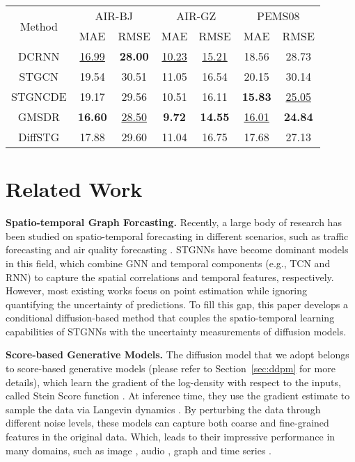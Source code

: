 {\begin{table}[htbp]
\begin{tabular}{c|cc|cc|cc}
\hline %
\multirow{2}{*}{Method}
& \multicolumn{2}{|c|}{ AIR-BJ}& \multicolumn{2}{|c|}{ AIR-GZ }& \multicolumn{2}{|c}{ PEMS08 }\\
\cline{2-7}
 & MAE & RMSE & MAE & RMSE & MAE & RMSE\\
\hline \hline
DCRNN & \underline{16.99} & \textbf{28.00} & \underline{10.23} & \underline{15.21} & 18.56 & 28.73 \\ \hline
STGCN & 19.54 & 30.51 & 11.05 & 16.54 & 20.15 & 30.14 \\ \hline
STGNCDE & 19.17 & 29.56 & 10.51 & 16.11 & \textbf{15.83} & \underline{25.05} \\ \hline
GMSDR & \textbf{16.60} & \underline{28.50} & \textbf{9.72} & \textbf{14.55} & \underline{16.01} & \textbf{24.84} \\ \hline
DiffSTG & 17.88 & 29.60 & 11.04 & 16.75 & 17.68 & 27.13 \\ \hline
\end{tabular}
\label{tab:results_determinstic}
\end{table}

\section{Related Work}\label{sec:related}

\par  \textbf{Spatio-temporal Graph Forcasting.} Recently, a large body of research has been studied on spatio-temporal forecasting in different scenarios, such as traffic forecasting \cite{STGCN-2018, GraphWaveNet-2019,  guo2021learning, peng2020spatial, ji2022stden} and air quality forecasting \cite{liang2022airformer}. STGNNs have become dominant models in this field, which combine GNN and temporal components (e.g., TCN and RNN) to capture the spatial correlations and temporal features, respectively. However, most existing works focus on point estimation while ignoring quantifying the uncertainty of predictions. To fill this gap, this paper develops a conditional diffusion-based method that couples the spatio-temporal learning capabilities of STGNNs with the uncertainty measurements of diffusion models.

\par \textbf{Score-based Generative Models.} The diffusion model that we adopt belongs to score-based generative models (please refer to Section~\ref{sec:ddpm} for more details), which learn the gradient of the log-density with respect to the inputs, called Stein Score function \cite{hyvarinen2005estimation, vincent2011connection}. At inference time, they use the gradient estimate to sample the data via Langevin dynamics \cite{song2019generative}. By perturbing the data through different noise levels, these models can capture both coarse and fine-grained features in the original data. Which, leads to their impressive performance in many domains, such as image  \cite{ho2020denoising}, audio \cite{kong2020diffwave, chen2020wavegrad}, graph \cite{niu2020permutation} and time series \cite{rasul2021autoregressive, tashiro2021csdi}. 

}
